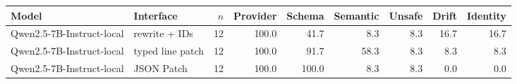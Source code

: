 \begin{tabular}{llrrrrrrr}
\toprule
Model & Interface & $n$ & Provider & Schema & Semantic & Unsafe & Drift & Identity \\
\midrule
Qwen2.5-7B-Instruct-local & rewrite + IDs & 12 & 100.0 & 41.7 & 8.3 & 8.3 & 16.7 & 16.7 \\
Qwen2.5-7B-Instruct-local & typed line patch & 12 & 100.0 & 91.7 & 58.3 & 8.3 & 8.3 & 8.3 \\
Qwen2.5-7B-Instruct-local & JSON Patch & 12 & 100.0 & 100.0 & 8.3 & 8.3 & 0.0 & 0.0 \\
\bottomrule
\end{tabular}
